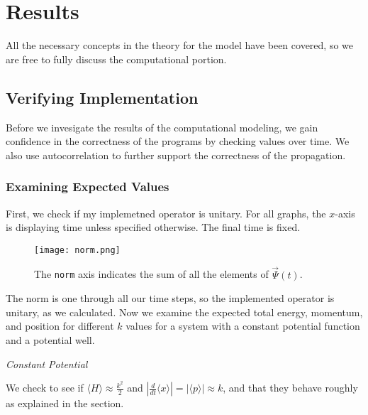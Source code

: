 \section*{Results}
\label{sec:Results}

All the necessary concepts in the theory for the model have been covered,
so we are free to fully discuss the computational portion.

\subsection*{Verifying Implementation}
\label{subsec:verify}

Before we invesigate the results of the computational modeling, we gain
confidence in the correctness of the programs by checking values over time.
We also use autocorrelation to further support the correctness of the
propagation.

\subsubsection*{Examining Expected Values}

First, we check if my implemetned operator is unitary. For all graphs, the
$x$-axis is displaying time unless specified otherwise. The final time is
fixed.

\begin{figure}[H]
    \centering
    \texttt{[image: norm.png]}
    \caption[Squared Magnitude of the Wave Function over Time]{The
    \texttt{norm} axis indicates the sum of all the elements of
    $\vec{\Psi}(t)$.}
\end{figure}

The norm is one through all our time steps, so the implemented operator is
unitary, as we calculated. Now we examine the expected total energy,
momentum, and position for different $k$ values for a system with a constant
potential function and a potential well.

\pagebreak

\begin{center}
    \textit{Constant Potential}
\end{center}

We check to see if $\langle H \rangle \approx \frac{k^2}{2}$ and $\left|
\frac{d}{dt} \langle x \rangle \right| = \left| \langle p \rangle \right|
\approx k$, and that they behave roughly as explained in the
 section.

